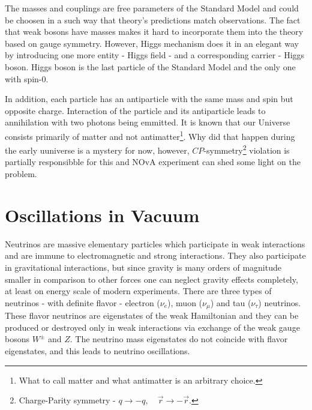 The masses and couplings are free parameters of the Standard Model and could be choosen in a such way 
that theory's predictions match observations. The fact that weak bosons have masses makes it hard 
to incorporate them into the theory based on gauge symmetry. However, Higgs mechanism does it in 
an elegant way by introducing one more entity - Higgs field - and a corresponding carrier - Higgs boson.
Higgs boson is the last particle of the Standard Model and the only one with spin-0. 

In addition, each particle has an antiparticle with the same mass and spin but opposite charge. 
Interaction of the particle and its antiparticle leads to annihilation with two photons being emmitted.
It is known that our Universe consists primarily of matter and not antimatter\footnote{What to call 
matter and what antimatter is an arbitrary choice.}. Why did that happen during the early uuniverse is 
a mystery for now, however, $CP$-symmetry\footnote{Charge-Parity symmetry - $q \rightarrow -q, \quad 
\vec{r} \rightarrow -\vec{r}$.} violation is partially responsibble for this and NOvA experiment can 
shed some light on the problem. 


\section{Oscillations in Vacuum}
Neutrinos are massive elementary particles which participate in weak interactions 
and are immune to electromagnetic and strong interactions. They also participate 
in gravitational interactions, but since gravity is many orders of magnitude smaller 
in comparison to other forces one can neglect gravity effects completely, at least 
on energy scale of modern experiments. There are three types of neutrinos - 
with definite flavor - electron ($\nu_e$), muon ($\nu_\mu$) and tau ($\nu_\tau$) 
neutrinos. These flavor neutrinos are eigenstates of the weak Hamiltonian and they 
can be produced or destroyed only in weak interactions via exchange of the weak 
gauge bosons $W^\pm$ and $Z$. The neutrino mass eigenstates do not coincide with 
flavor eigenstates, and this leads to neutrino oscillations.

